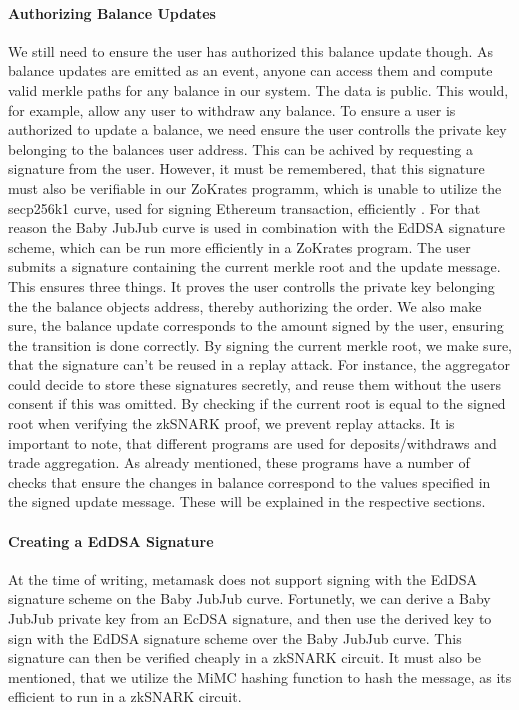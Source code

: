 \documentclass[../../thesis.tex]{subfiles}
\begin{document}
\paragraph{Authorizing Balance Updates}
We still need to ensure the user has authorized this balance update though. As balance updates are emitted as an event, anyone can access them and compute valid merkle paths for any balance in our system. The data is public. This would, for example, allow any user to withdraw any balance. To ensure a user is authorized to update a balance, we need ensure the user controlls the private key belonging to the balances user address. This can be achived by requesting a signature from the user. However, it must be remembered, that this signature must also be verifiable in our ZoKrates programm, which is unable to utilize the secp256k1 curve, used for signing Ethereum transaction, efficiently \cite{deml_2019}. For that reason the Baby JubJub curve is used in combination with the EdDSA signature scheme, which can be run more efficiently in a ZoKrates program. The user submits a signature containing the current merkle root and the update message. This ensures three things. It proves the user controlls the private key belonging the the balance objects address, thereby authorizing the order. We also make sure, the balance update corresponds to the amount signed by the user, ensuring the transition is done correctly. By signing the current merkle root, we make sure, that the signature can't be reused in a replay attack. For instance, the aggregator could decide to store these signatures secretly, and reuse them without the users consent if this was omitted. By checking if the current root is equal to the signed root when verifying the zkSNARK proof, we prevent replay attacks. It is important to note, that different programs are used for deposits/withdraws and trade aggregation. As already mentioned, these programs have a number of checks that ensure the changes in balance correspond to the values specified in the signed update message. These will be explained in the respective sections. 

\paragraph{Creating a EdDSA Signature}
At the time of writing, metamask does not support signing with the EdDSA signature scheme on the Baby JubJub curve. Fortunetly, we can derive a Baby JubJub private key from an EcDSA signature, and then use the derived key to sign with the EdDSA signature scheme over the Baby JubJub curve. This signature can then be verified cheaply in a zkSNARK circuit. It must also be mentioned, that we utilize the MiMC hashing function to hash the message, as its efficient to run in a zkSNARK circuit. 
\end{document}
